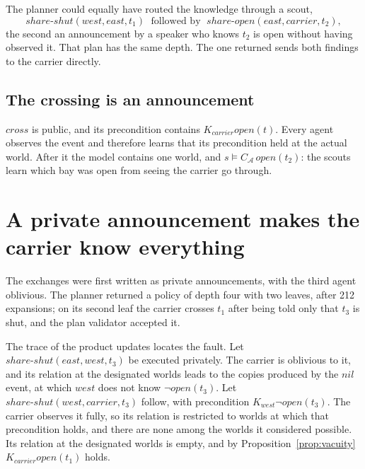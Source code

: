 \documentclass[11pt,a4paper]{article}
\theoremstyle{definition}
\newcommand{\Ag}{\mathcal{A}}
\newcommand{\Kop}[1]{K_{#1}}
\newcommand{\ag}[1]{\mathit{#1}}
\newcommand{\op}{\mathit{open}}
\begin{document}
The planner could equally have routed the knowledge through a scout,
\[
  \mathit{share\text{-}shut}(\ag{west}, \ag{east}, t_1)
  \;\text{ followed by }\;
  \mathit{share\text{-}open}(\ag{east}, \ag{carrier}, t_2),
\]
the second an announcement by a speaker who knows $t_2$ is open without having
observed it. That plan has
the same depth. The one returned sends both findings to the carrier directly.

\subsection{The crossing is an announcement}

$\mathit{cross}$ is public, and its precondition contains
$\Kop{\ag{carrier}}\op(t)$. Every agent observes the event and therefore
learns that its precondition held at the actual world. After it the model
contains one world, and $s \models C_{\Ag}\,\op(t_2)$: the scouts learn which
bay was open from seeing the carrier go through.

\section{A private announcement makes the carrier know everything}
\label{sec:private}

The exchanges were first written as private announcements, with the third
agent oblivious. The planner returned a policy of depth four with two leaves,
after 212 expansions; on its second leaf the carrier crosses $t_1$ after being
told only that $t_3$ is shut, and the plan validator accepted it.

The trace of the product updates locates the fault. Let
$\mathit{share\text{-}shut}(\ag{east}, \ag{west}, t_3)$ be executed privately.
The carrier is oblivious to it, and its relation at the designated worlds leads
to the copies produced by the $\mathit{nil}$ event, at which $\ag{west}$ does
not know $\neg\op(t_3)$. Let $\mathit{share\text{-}shut}(\ag{west},
\ag{carrier}, t_3)$ follow, with precondition $\Kop{\ag{west}}\neg\op(t_3)$.
The carrier observes it fully, so its relation is restricted to worlds at which
that precondition holds, and there are none among the worlds it considered
possible. Its relation at the designated worlds is empty, and by
Proposition~\ref{prop:vacuity} $\Kop{\ag{carrier}}\op(t_1)$ holds.
\end{document}

